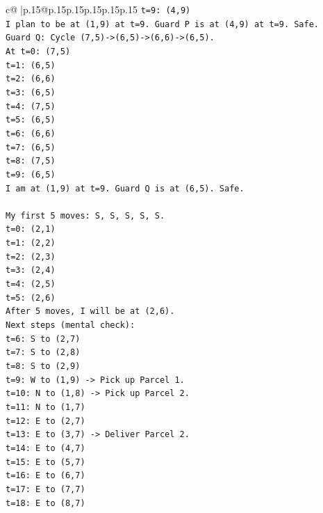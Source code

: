 \documentclass{article}
\begin{document}
{\begin{supertabular}{c@{$\;$}|p{.15\linewidth}@{}p{.15\linewidth}p{.15\linewidth}p{.15\linewidth}p{.15\linewidth}p{.15\linewidth}}
{{{\texttt{t=9: (4,9)} \\
\texttt{I plan to be at (1,9) at t=9. Guard P is at (4,9) at t=9. Safe.} \\
\texttt{Guard Q: Cycle (7,5){-}>(6,5){-}>(6,6){-}>(6,5).} \\
\texttt{At t=0: (7,5)} \\
\texttt{t=1: (6,5)} \\
\texttt{t=2: (6,6)} \\
\texttt{t=3: (6,5)} \\
\texttt{t=4: (7,5)} \\
\texttt{t=5: (6,5)} \\
\texttt{t=6: (6,6)} \\
\texttt{t=7: (6,5)} \\
\texttt{t=8: (7,5)} \\
\texttt{t=9: (6,5)} \\
\texttt{I am at (1,9) at t=9. Guard Q is at (6,5). Safe.} \\
\\ 
\texttt{My first 5 moves: S, S, S, S, S.} \\
\texttt{t=0: (2,1)} \\
\texttt{t=1: (2,2)} \\
\texttt{t=2: (2,3)} \\
\texttt{t=3: (2,4)} \\
\texttt{t=4: (2,5)} \\
\texttt{t=5: (2,6)} \\
\texttt{After 5 moves, I will be at (2,6).} \\
\texttt{Next steps (mental check):} \\
\texttt{t=6: S to (2,7)} \\
\texttt{t=7: S to (2,8)} \\
\texttt{t=8: S to (2,9)} \\
\texttt{t=9: W to (1,9) {-}> Pick up Parcel 1.} \\
\texttt{t=10: N to (1,8) {-}> Pick up Parcel 2.} \\
\texttt{t=11: N to (1,7)} \\
\texttt{t=12: E to (2,7)} \\
\texttt{t=13: E to (3,7) {-}> Deliver Parcel 2.} \\
\texttt{t=14: E to (4,7)} \\
\texttt{t=15: E to (5,7)} \\
\texttt{t=16: E to (6,7)} \\
\texttt{t=17: E to (7,7)} \\
\texttt{t=18: E to (8,7)} \\
}}}
\end{supertabular}}
\end{document}
